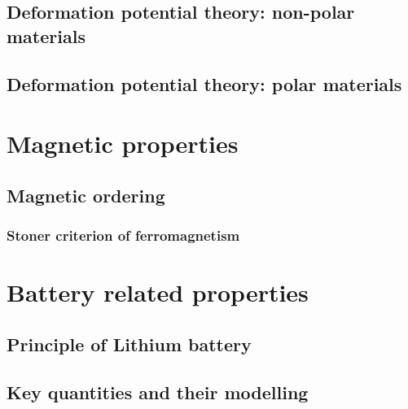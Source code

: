 \subsection{Deformation potential theory: non-polar materials}
\subsection{Deformation potential theory: polar materials}

\section{Magnetic properties}
\subsection{Magnetic ordering}
\subsubsection{Stoner criterion of ferromagnetism}

\section{Battery related properties}
\subsection{Principle of Lithium battery}
\subsection{Key quantities and their modelling}